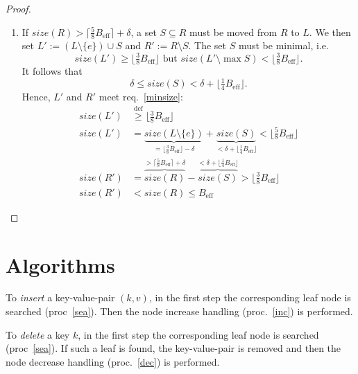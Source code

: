 \documentclass{vldb}
\newcommand \Beff { B_{\text{eff}} }
\begin{document}
\begin{proof}
\begin{enumerate}
\item
If \mbox{$size(R) > \lceil \frac{5}{8} \Beff \rceil + \delta$}, a set
\mbox{$S \subseteq R$} must be moved from $R$ to $L$.
We then set \mbox{$L' := (L \setminus \{e\}) \cup S$} and
\mbox{$R' := R \setminus S$}.
The set $S$ must be minimal, i.e.
\[ size(L') \geq \lfloor \tfrac{3}{8} \Beff \rfloor \text{ but }
    size(L' \setminus \max S) < \lfloor \tfrac{3}{8} \Beff \rfloor. \]
It follows that
\[ \delta \leq size(S) < \delta + \lfloor \tfrac{1}{4} \Beff \rfloor. \]
Hence, $L'$ and $R'$ meet req.~\ref{minsize}:
\begin{align*}
size(L')
    &\stackrel{\mathrm{def}}{\geq} \lfloor \tfrac{3}{8} \Beff \rfloor\\
size(L')
    &= \underbrace{size(L \setminus \{e\})}_{
            = \lfloor \frac{3}{8} \Beff \rfloor - \delta}
        + \underbrace{size(S)}_{
            < \delta + \lfloor \frac{1}{4} \Beff \rfloor}
    < \lfloor \tfrac{5}{8} \Beff \rfloor\\
size(R')
    &= \overbrace{size(R)}^{
            > \lceil \frac{5}{8} \Beff \rceil + \delta}
        - \overbrace{size(S)}^{
            < \delta + \lfloor \frac{1}{4} \Beff \rfloor}
    > \lfloor \tfrac{3}{8} \Beff \rfloor\\
size(R')
    &< size(R) \leq \Beff
\end{align*}
\end{enumerate}
\end{proof}



\section{Algorithms} %

\begin{proc} \label{ins}
To {\em insert} a key-value-pair \mbox{$(k, v)$}, in the first step the
corresponding leaf node is searched (proc~\ref{sea}).
Then the node increase handling (proc.~\ref{inc}) is performed.
\end{proc}


\begin{proc} \label{del}
To {\em delete} a key $k$, in the first step the corresponding
leaf node is searched (proc~\ref{sea}).
If such a leaf is found, the key-value-pair is removed and then the node
decrease handling (proc.~\ref{dec}) is performed.
\end{proc}
\end{document}
